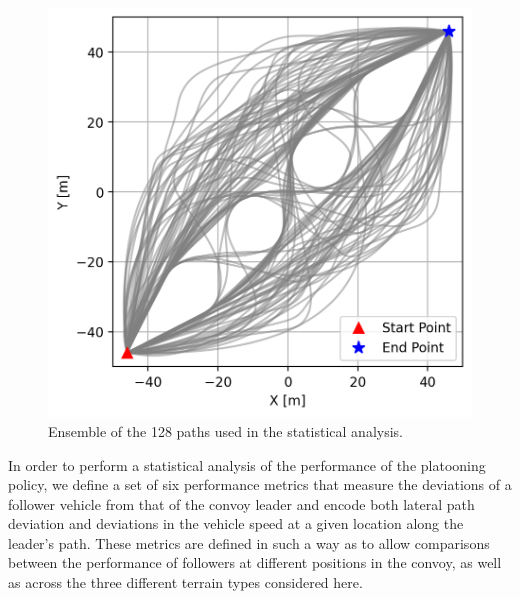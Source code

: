 \documentclass[12pt,twocolumn]{article}
\begin{document}
\begin{figure}
    \centering
    \includegraphics[width=\columnwidth]{Figs/StatisticalAnalysis/all_possible_paths.png}
    \caption{Ensemble of the 128 paths used in the statistical analysis.}   
    \label{fig:synchronoallpaths}
\end{figure}


In order to perform a statistical analysis of the performance of the platooning policy, we define a set of six performance metrics that measure the deviations of a follower vehicle from that of the convoy leader and encode both lateral path deviation and deviations in the vehicle speed at a given location along the leader's path.  These metrics are defined in such a way as to allow comparisons between the performance of followers at different positions in the convoy, as well as across the three different terrain types considered here.
\end{document}
